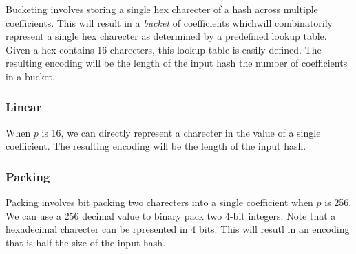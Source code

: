 Bucketing involves storing a single hex charecter of a hash across multiple coefficients.
This will result in a \textit{bucket} of coefficients whichwill combinatorily represent a single
hex charecter as determined by a predefined lookup table. Given a hex contains 16
charecters, this lookup table is easily defined. The resulting encoding will be the length
of the input hash \times the number of coefficients in a bucket.

\subsubsection{Linear}

When $p$ is 16, we can directly represent a charecter in the value of a single
coefficient. The resulting encoding will be the length of the input hash.

\subsubsection{Packing}

Packing involves bit packing two charecters into a single coefficient when $p$ is 256. We
can use a 256 decimal value to binary pack two 4-bit integers. Note that a hexadecimal
charecter can be rpresented in 4 bits. This will resutl in an encoding that is half the
size of the input hash.
